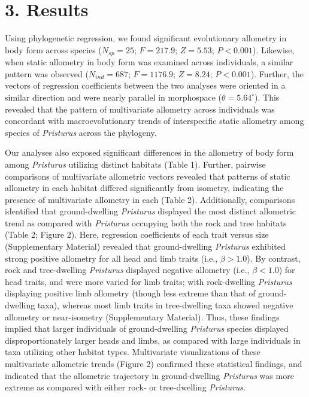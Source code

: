 \documentclass[
  11pt,
]{article}
\begin{document}
\hypertarget{results}{%
\section{3. Results}\label{results}}

Using phylogenetic regression, we found significant evolutionary
allometry in body form across species (\(N_{sp}=25\); \(F = 217.9\);
\(Z =5.53\); \(P < 0.001\)). Likewise, when static allometry in body
form was examined across individuals, a similar pattern was observed
(\(N_{ind}=687\); \(F = 1176.9\); \(Z =8.24\); \(P < 0.001\)). Further,
the vectors of regression coefficients between the two analyses were
oriented in a similar direction and were nearly parallel in morphospace
(\(\theta = 5.64^\circ\)). This revealed that the pattern of
multivariate allometry across individuals was concordant with
macroevolutionary trends of interspecific static allometry among species
of \emph{Pristurus} across the phylogeny. \hfill\break

Our analyses also exposed significant differences in the allometry of
body form among \emph{Pristurus} utilizing distinct habitats (Table 1).
Further, pairwise comparisons of multivariate allometric vectors
revealed that patterns of static allometry in each habitat differed
significantly from isometry, indicating the presence of multivariate
allometry in each (Table 2). Additionally, comparisons identified that
ground-dwelling \emph{Pristurus} displayed the most distinct allometric
trend as compared with \emph{Pristurus} occupying both the rock and tree
habitats (Table 2; Figure 2). Here, regression coefficients of each
trait versus size (Supplementary Material) revealed that ground-dwelling
\emph{Pristurus} exhibited strong positive allometry for all head and
limb traits (i.e., \(\beta>1.0\)). By contrast, rock and tree-dwelling
\emph{Pristurus} displayed negative allometry (i.e., \(\beta < 1.0\))
for head traits, and were more varied for limb traits; with
rock-dwelling \emph{Pristurus} displaying positive limb allometry
(though less extreme than that of ground-dwelling taxa), whereas most
limb traits in tree-dwelling taxa showed negative allometry or
near-isometry (Supplementary Material). Thus, these findings implied
that larger individuals of ground-dwelling \emph{Pristurus} species
displayed disproportionately larger heads and limbs, as compared with
large individuals in taxa utilizing other habitat types. Multivariate
visualizations of these multivariate allometric trends (Figure 2)
confirmed these statistical findings, and indicated that the allometric
trajectory in ground-dwelling \emph{Pristurus} was more extreme as
compared with either rock- or tree-dwelling \emph{Pristurus}.
\hfill\break
\end{document}
